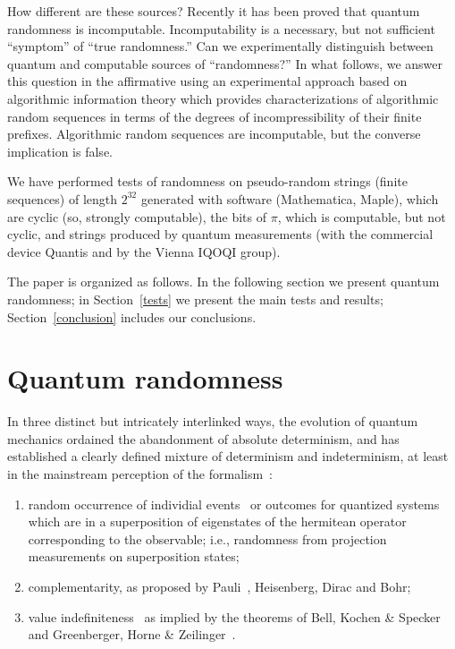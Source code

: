\documentclass[10pt]{article}%
\begin{document}
How different are these sources? Recently it has been proved that quantum randomness is incomputable.%
Incomputability is a necessary, but not sufficient ``symptom''
of ``true randomness.''  Can we
 experimentally  distinguish between
quantum  and   computable
sources of  ``randomness?''
In what follows, we   answer this question in the affirmative using an experimental approach based on algorithmic information theory
which provides characterizations of algorithmic random sequences in terms of the degrees of incompressibility of their finite prefixes. Algorithmic random sequences are incomputable, but the converse implication is false.
\fi


We have performed tests of randomness on pseudo-random strings (finite sequences) of length $2^{32}$ generated with software
(Mathematica, Maple), which are  cyclic (so, strongly computable), the bits of $\pi$, which is computable, but not cyclic, and strings produced by quantum measurements  (with the commercial device Quantis and  by the Vienna IQOQI group).





The paper is organized as follows. In the following section we present quantum randomness;
in Section~\ref{tests} we present the main tests and results; Section~\ref{conclusion} includes our conclusions.

\section{Quantum randomness}


In three distinct but intricately interlinked ways, the evolution of quantum mechanics ordained the abandonment
of absolute determinism, and has established a clearly defined mixture of determinism and indeterminism,
at least in the mainstream perception of the formalism~\cite{jammer:89,jammer1,feynman-law,fuchs-peres,clauser-talkvie}:
\renewcommand{\labelenumi}{(\roman{enumi})}
\begin{enumerate}
\item
random occurrence of individial events~\cite{born-26-1,born-26-2} or outcomes for quantized systems
which are in a superposition of eigenstates of the hermitean operator
corresponding to the observable;
i.e., randomness from projection measurements on superposition states;
\item
complementarity, as proposed by Pauli~\cite{pauli:58}, Heisenberg, Dirac and Bohr;
\item
value indefiniteness~\cite{peres222} as implied by the theorems of Bell, Kochen \& Specker and Greenberger, Horne \& Zeilinger~\cite{mermin-93}.
\end{enumerate}
\end{document}

